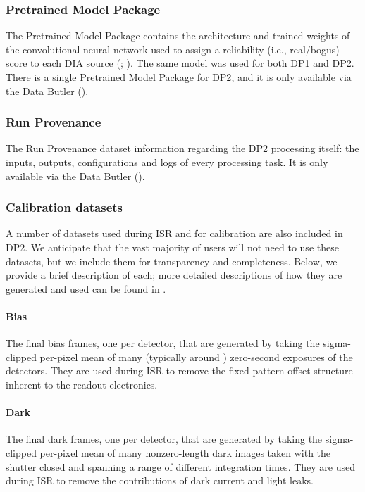 \subsubsection{Pretrained Model Package}
The Pretrained Model Package contains the architecture and trained weights of the convolutional neural network used to assign a reliability (i.e., real/bogus) score to each \gls{DIA} source (; \citealt[][]{DMTN-337}).
The same model was used for both \gls{DP1} and \gls{DP2}.
There is a single Pretrained Model Package for \gls{DP2}, and it is only available via the Data \gls{Butler} ().

\subsubsection{Run Provenance}
The Run Provenance dataset information regarding the DP2 processing itself: the inputs, outputs, configurations and logs of every processing task.
It is only available via the Data \gls{Butler} ().

\subsubsection{Calibration datasets}
\label{sssec:calibration_images}
A number of datasets used during \gls{ISR} and for calibration are also included in DP2.
We anticipate that the vast majority of users will not need to use these datasets, but we include them for transparency and completeness.
Below, we provide a brief description of each; more detailed descriptions of how they are generated and used can be found in \citet[][]{2025JATIS..11a1209P}.
\paragraph{Bias}
The final bias frames, one per detector, that are generated by taking the sigma-clipped per-pixel mean of many (typically around \ninputbias) zero-second exposures of the detectors.
They are used during \gls{ISR} to remove the fixed-pattern offset structure inherent to the readout electronics.
\paragraph{Dark}
The final dark frames, one per detector, that are generated by taking the sigma-clipped per-pixel mean of many nonzero-length dark images taken with the shutter closed and spanning a range of different integration times.
They are used during \gls{ISR} to remove the contributions of dark current and light leaks.
